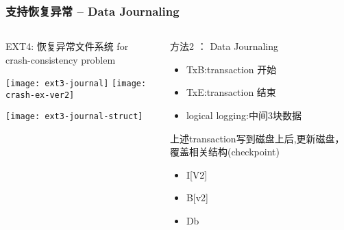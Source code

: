 \begin{frame}[fragile]
	\frametitle{支持恢复异常 -- Data Journaling}
	\begin{columns}
		\begin{column}{.5\textwidth}
			EXT4: 恢复异常文件系统 for crash-consistency problem
			
			\centering
			\texttt{[image: ext3-journal]}
			\texttt{[image: crash-ex-ver2]}
			
			\texttt{[image: ext3-journal-struct]}	
		\end{column}
		\begin{column}{.5\textwidth}			
			方法2 ： Data Journaling
			\begin{itemize}
				\item TxB:transaction 开始
				\item TxE:transaction 结束
				\item logical logging:中间3块数据
			\end{itemize}
			\pause
			上述transaction写到磁盘上后,更新磁盘，覆盖相关结构(checkpoint)
			\begin{itemize}	
				\item I[V2]
				\item B[v2]
				\item Db
			\end{itemize}
			
		\end{column}
	\end{columns}
	
\end{frame}
